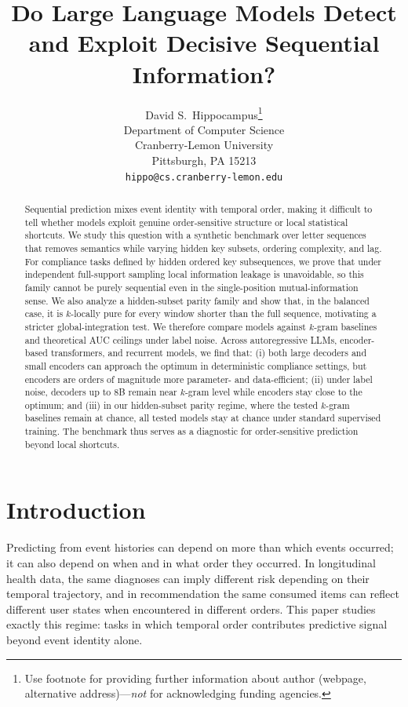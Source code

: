 \documentclass{article}
\title{Do Large Language Models Detect and Exploit Decisive Sequential Information?}
\author{%
  David S.~Hippocampus\thanks{Use footnote for providing further information
    about author (webpage, alternative address)---\emph{not} for acknowledging
    funding agencies.} \\
  Department of Computer Science\\
  Cranberry-Lemon University\\
  Pittsburgh, PA 15213 \\
  \texttt{hippo@cs.cranberry-lemon.edu} \\
}
\theoremstyle{plain}
\theoremstyle{definition}
\theoremstyle{remark}
\begin{document}
\maketitle

\begin{abstract}
Sequential prediction mixes event identity with temporal order, making it difficult to tell whether models exploit genuine order-sensitive structure or local statistical shortcuts. We study this question with a synthetic benchmark over letter sequences that removes semantics while varying hidden key subsets, ordering complexity, and lag. For compliance tasks defined by hidden ordered key subsequences, we prove that under independent full-support sampling local information leakage is unavoidable, so this family cannot be purely sequential even in the single-position mutual-information sense. We also analyze a hidden-subset parity family and show that, in the balanced case, it is $k$-locally pure for every window shorter than the full sequence, motivating a stricter global-integration test. We therefore compare models against $k$-gram baselines and theoretical AUC ceilings under label noise. Across autoregressive LLMs, encoder-based transformers, and recurrent models, we find that: (i) both large decoders and small encoders can approach the optimum in deterministic compliance settings, but encoders are orders of magnitude more parameter- and data-efficient; (ii) under label noise, decoders up to 8B remain near $k$-gram level while encoders stay close to the optimum; and (iii) in our hidden-subset parity regime, where the tested $k$-gram baselines remain at chance, all tested models stay at chance under standard supervised training. The benchmark thus serves as a diagnostic for order-sensitive prediction beyond local shortcuts.
\end{abstract}

\section{Introduction}
\label{sec:introduction}

Predicting from event histories can depend on more than which events occurred; it can also depend on when and in what order they occurred. In longitudinal health data, the same diagnoses can imply different risk depending on their temporal trajectory, and in recommendation the same consumed items can reflect different user states when encountered in different orders. This paper studies exactly this regime: tasks in which temporal order contributes predictive signal beyond event identity alone.
\end{document}
